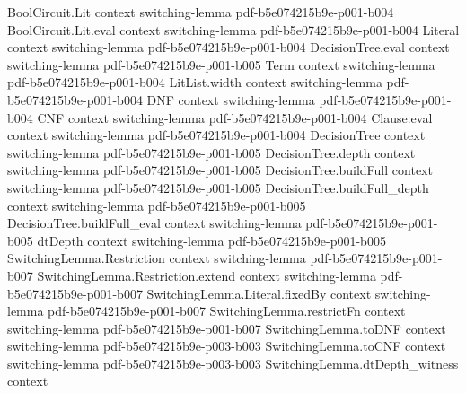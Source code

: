 \begin{lemma}
\label{LMN.switched_gates_give_new_dnfs}
\leanok
{}
\proofstep
  {BoolCircuit.Lit}
  {context}
  {switching-lemma}
  {pdf-b5e074215b9e-p001-b004}
\proofstep
  {BoolCircuit.Lit.eval}
  {context}
  {switching-lemma}
  {pdf-b5e074215b9e-p001-b004}
\proofstep
  {Literal}
  {context}
  {switching-lemma}
  {pdf-b5e074215b9e-p001-b004}
\proofstep
  {DecisionTree.eval}
  {context}
  {switching-lemma}
  {pdf-b5e074215b9e-p001-b005}
\proofstep
  {Term}
  {context}
  {switching-lemma}
  {pdf-b5e074215b9e-p001-b004}
\proofstep
  {LitList.width}
  {context}
  {switching-lemma}
  {pdf-b5e074215b9e-p001-b004}
\proofstep
  {DNF}
  {context}
  {switching-lemma}
  {pdf-b5e074215b9e-p001-b004}
\proofstep
  {CNF}
  {context}
  {switching-lemma}
  {pdf-b5e074215b9e-p001-b004}
\proofstep
  {Clause.eval}
  {context}
  {switching-lemma}
  {pdf-b5e074215b9e-p001-b004}
\proofstep
  {DecisionTree}
  {context}
  {switching-lemma}
  {pdf-b5e074215b9e-p001-b005}
\proofstep
  {DecisionTree.depth}
  {context}
  {switching-lemma}
  {pdf-b5e074215b9e-p001-b005}
\proofstep
  {DecisionTree.buildFull}
  {context}
  {switching-lemma}
  {pdf-b5e074215b9e-p001-b005}
\proofstep
  {DecisionTree.buildFull_depth}
  {context}
  {switching-lemma}
  {pdf-b5e074215b9e-p001-b005}
\proofstep
  {DecisionTree.buildFull_eval}
  {context}
  {switching-lemma}
  {pdf-b5e074215b9e-p001-b005}
\proofstep
  {dtDepth}
  {context}
  {switching-lemma}
  {pdf-b5e074215b9e-p001-b005}
\proofstep
  {SwitchingLemma.Restriction}
  {context}
  {switching-lemma}
  {pdf-b5e074215b9e-p001-b007}
\proofstep
  {SwitchingLemma.Restriction.extend}
  {context}
  {switching-lemma}
  {pdf-b5e074215b9e-p001-b007}
\proofstep
  {SwitchingLemma.Literal.fixedBy}
  {context}
  {switching-lemma}
  {pdf-b5e074215b9e-p001-b007}
\proofstep
  {SwitchingLemma.restrictFn}
  {context}
  {switching-lemma}
  {pdf-b5e074215b9e-p001-b007}
\proofstep
  {SwitchingLemma.toDNF}
  {context}
  {switching-lemma}
  {pdf-b5e074215b9e-p003-b003}
\proofstep
  {SwitchingLemma.toCNF}
  {context}
  {switching-lemma}
  {pdf-b5e074215b9e-p003-b003}
\proofstep
  {SwitchingLemma.dtDepth_witness}
  {context}

\end{lemma}
